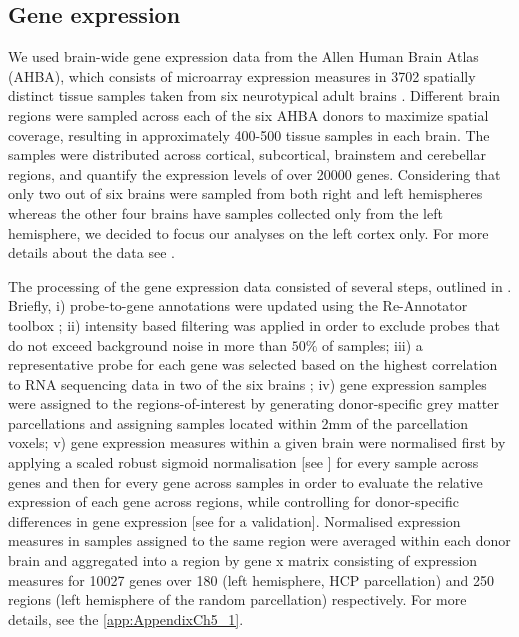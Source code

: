 \subsection{Gene expression}

We used brain-wide gene expression data from the Allen Human Brain Atlas (AHBA), which consists of microarray expression measures in 3702 spatially distinct tissue samples taken from six neurotypical adult brains \citep{Hawrylycz2012}. Different brain regions were sampled across each of the six AHBA donors to maximize spatial coverage, resulting in approximately 400-500 tissue samples in each brain. The samples were distributed across cortical, subcortical, brainstem and cerebellar regions, and quantify the expression levels of over \num{20000} genes. Considering that only two out of six brains were sampled from both right and left hemispheres whereas the other four brains have samples collected only from the left hemisphere, we decided to focus our analyses on the left cortex only. For more details about the data see \citep{Hawrylycz2012}.

The processing of the gene expression data consisted of several steps, outlined in \citep{Arnatkeviciute2019}. Briefly, i) probe-to-gene annotations were updated using the Re-Annotator toolbox \citep{Arloth2015}; ii) intensity based filtering was applied in order to exclude probes that do not exceed background noise in more than $50\%$ of samples; iii) a representative probe for each gene was selected based on the highest correlation to RNA sequencing data in two of the six brains \citep{Miller2014a}; iv) gene expression samples were assigned to the regions-of-interest by generating donor-specific grey matter parcellations and assigning samples located within 2mm of the parcellation voxels; v) gene expression measures within a given brain were normalised first by applying a scaled robust sigmoid normalisation [see \citet{Arnatkeviciute2019}] for every sample across genes and then for every gene across samples in order to evaluate the relative expression of each gene across regions, while controlling for donor-specific differences in gene expression [see \citet{Arnatkeviciute2019} for a validation]. Normalised expression measures in samples assigned to the same region were averaged within each donor brain and aggregated into a region by gene x matrix consisting of expression measures for \num{10027} genes over 180 (left hemisphere, HCP parcellation) and 250 regions (left hemisphere of the random parcellation) respectively. For more details, see the \ref{app:AppendixCh5_1}.


